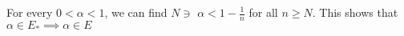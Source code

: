 \documentclass[preview]{standalone}
\begin{document}
\begin{center}
For every $0 < \alpha < 1$, we can find $N \ni$ $\alpha < 1-\frac{1}{n}$ for all $n \ge N$. This shows that $\alpha \in E_* \implies \alpha \in E$
\end{center}
\end{document}
